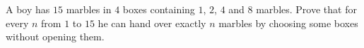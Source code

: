 A boy has $15$ marbles in $4$ boxes containing $1$, $2$, $4$ and $8$ marbles. Prove that for every $n$ from $1$ to $15$ he can hand over exactly $n$ marbles by choosing some boxes without opening them.
